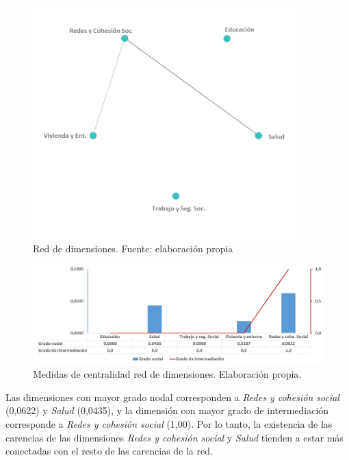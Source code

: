 \documentclass[12pt,letterpaper,spanish]{article}
\begin{document}
\begin{figure}[H]
  \centering
      \includegraphics[height=9cm]{Grafos/GrafoDimensiones.png} 
    \caption{Red de dimensiones. Fuente: elaboración propia}
    \label{grafodimpos}
\end{figure}
\begin{figure}[H]
    \centering
        \includegraphics[width=\textwidth]{Grafos/nc_dimensional.png}
    \caption{Medidas de centralidad red de dimensiones. Elaboración propia.}
    \label{analisisDIMPOS}
\end{figure}




Las dimensiones con mayor grado nodal corresponden a \textit{Redes y cohesión social} (0,0622) y \textit{Salud} (0,0435), y la dimensión con mayor grado de intermediación corresponde a \textit{Redes y cohesión social} (1,00). Por lo tanto, la existencia de las carencias de las dimensiones  \textit{Redes y cohesión social} y \textit{Salud} tienden a estar más conectadas con el resto de las carencias de la red.
\end{document}
